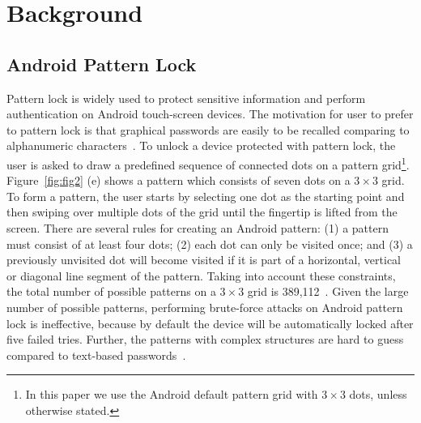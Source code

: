 %
%
%
%
%
%
%
%
%
%
\section{Background}
    \subsection{Android Pattern Lock}
        Pattern lock is widely used to protect sensitive information and perform authentication on
        Android touch-screen devices. The motivation for user to prefer to pattern lock is that graphical passwords are easily to be recalled comparing to alphanumeric characters~\cite{standing1970perception, Weiss2008PassShapes}. To unlock a device protected with pattern lock, the user is asked to draw a predefined sequence of connected dots on a pattern grid\footnote{In this paper we use the Android default pattern grid with $3 \times 3$ dots, unless otherwise stated.}.
        Figure~\ref{fig:fig2} (e) shows a pattern which consists of seven dots on a $3 \times 3$ grid.
        To form a
        pattern, the user starts by selecting one dot as the
        starting point and then swiping over multiple dots of the grid until the fingertip is lifted from the screen.
        There are several rules for creating an Android pattern: (1) a pattern must consist
        of at least four dots; (2) each dot can only be visited once; and (3) a previously unvisited dot will
        become visited if it is part of a horizontal, vertical or diagonal
        line segment of the pattern. Taking into account these constraints, the total number of possible patterns
        on a $3\times3$ grid is 389,112~\cite{uellenbeck2013quantifying}.
        Given the large number of possible patterns, performing brute-force attacks on
        Android pattern lock is ineffective, because by default the device will be
        automatically locked after five failed tries. Further, the patterns with complex structures are hard to guess compared to text-based passwords~\cite{Kelley2012Guess,Mazurek2013Measuring}.

